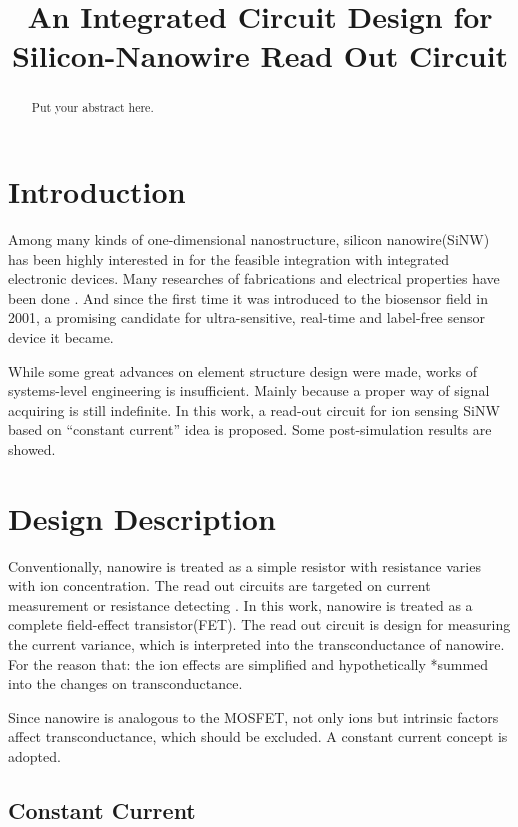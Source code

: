 \documentclass{article}
\title{An Integrated Circuit Design for Silicon-Nanowire Read Out Circuit}
\begin{document}
%
\maketitle
%
\begin{abstract}
Put your abstract here.

\end{abstract}
%
\section{Introduction}
\label{sec:intro}

Among many kinds of one-dimensional nanostructure, silicon nanowire(SiNW) has been highly interested in for the feasible integration with integrated electronic devices.
Many researches of fabrications and electrical properties have been done \cite{J1}.
And since the first time it was introduced to the biosensor field in 2001\cite{J2}, a promising candidate for ultra-sensitive, real-time and label-free  sensor device it became.

While some great advances on element structure design were made\cite{J3}, works of systems-level engineering is insufficient.
Mainly because a proper way of signal acquiring is still indefinite.
In this work, a read-out circuit for ion sensing SiNW based on “constant current” idea is proposed.
Some post-simulation results are showed.



\section{Design Description}
\label{sec:rules}

Conventionally, nanowire is treated as a simple resistor with resistance varies with ion concentration.
The read out circuits are targeted on current measurement \cite{J4} or resistance detecting \cite{C5}.
In this work, nanowire is treated as a complete field-effect transistor(FET).
The read out circuit is design for measuring the current variance, which is interpreted into the transconductance of nanowire.
For the reason that: the ion effects are simplified and hypothetically *summed into the changes on transconductance.

Since nanowire is analogous to the MOSFET, not only ions but intrinsic factors affect transconductance, which should be excluded.
A constant current concept is adopted.

\subsection{Constant Current}
\end{document}
